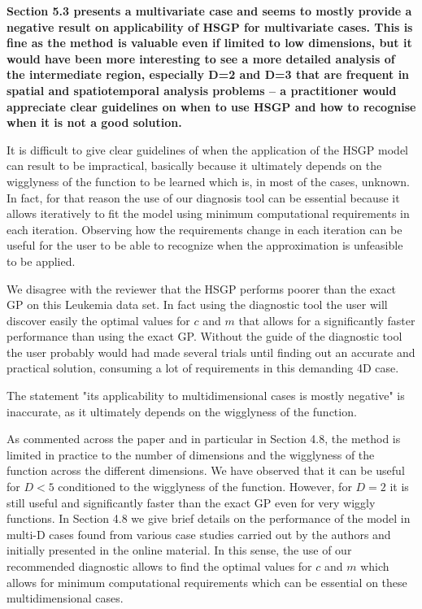 \documentclass[11pt]{report}
\begin{document}
\textbf{Section 5.3 presents a multivariate case and seems to mostly provide a negative result on applicability of HSGP for multivariate cases. This is fine as the method is valuable even if limited to low dimensions, but it would have been more interesting to see a more detailed analysis of the intermediate region, especially D=2 and D=3 that are frequent in spatial and spatiotemporal analysis problems -- a practitioner would appreciate clear guidelines on when to use HSGP and how to recognise when it is not a good solution.}

It is difficult to give clear guidelines of when the application of the HSGP model can result to be impractical, basically because it ultimately depends on the wigglyness of the function to be learned which is, in most of the cases, unknown. In fact, for that reason the use of our diagnosis tool can be essential because it allows iteratively to fit the model using minimum computational requirements in each iteration. Observing how the requirements change in each iteration can be useful for the user to be able to recognize when the approximation is unfeasible to be applied.

We disagree with the reviewer that the HSGP performs poorer than the exact GP on this Leukemia data set. In fact using the diagnostic tool the user will discover easily the optimal values for $c$ and $m$ that allows for a significantly faster performance than using the exact GP. Without the guide of the diagnostic tool the user probably would had made several trials until finding out an accurate and practical solution, consuming a lot of requirements in this demanding 4D case.

The statement "its applicability to multidimensional cases is mostly negative" is inaccurate, as it ultimately depends on the wigglyness of the function.

As commented across the paper and in particular in Section 4.8, the method is limited in practice to the number of dimensions and the wigglyness of the function across the different dimensions. We have observed that it can be useful for $D<5$ conditioned to the wigglyness of the function. However, for $D=2$ it is still useful and significantly faster than the exact GP even for very wiggly functions. In Section 4.8 we give brief details on the performance of the model in multi-D cases found from various case studies carried out by the authors and initially presented in the online material. In this sense, the use of our recommended diagnostic allows to find the optimal values for $c$ and $m$ which allows for minimum computational requirements which can be essential on these multidimensional cases.
\end{document}
